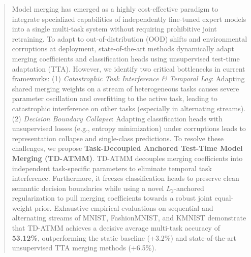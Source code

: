 \documentclass{article}
\theoremstyle{plain}
\theoremstyle{definition}
\theoremstyle{remark}
\begin{document}

\printAffiliationsAndNotice{}

\begin{abstract}
Model merging has emerged as a highly cost-effective paradigm to integrate specialized capabilities of independently fine-tuned expert models into a single multi-task system without requiring prohibitive joint retraining. To adapt to out-of-distribution (OOD) shifts and environmental corruptions at deployment, state-of-the-art methods dynamically adapt merging coefficients and classification heads using unsupervised test-time adaptation (TTA). However, we identify two critical bottlenecks in current frameworks: (1) \emph{Catastrophic Task Interference \& Temporal Lag}: Adapting shared merging weights on a stream of heterogeneous tasks causes severe parameter oscillation and overfitting to the active task, leading to catastrophic interference on other tasks (especially in alternating streams). (2) \emph{Decision Boundary Collapse}: Adapting classification heads with unsupervised losses (e.g., entropy minimization) under corruptions leads to representation collapse and single-class predictions. To resolve these challenges, we propose \textbf{Task-Decoupled Anchored Test-Time Model Merging (TD-ATMM)}. TD-ATMM decouples merging coefficients into independent task-specific parameters to eliminate temporal task interference. Furthermore, it freezes classification heads to preserve clean semantic decision boundaries while using a novel $L_2$-anchored regularization to pull merging coefficients towards a robust joint equal-weight prior. Exhaustive empirical evaluations on sequential and alternating streams of MNIST, FashionMNIST, and KMNIST demonstrate that TD-ATMM achieves a decisive average multi-task accuracy of \textbf{53.12\%}, outperforming the static baseline (+3.2\%) and state-of-the-art unsupervised TTA merging methods (+6.5\%).
\end{abstract}
\end{document}
